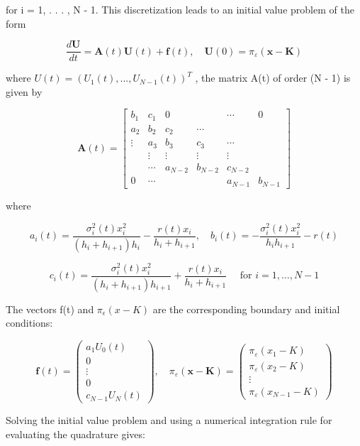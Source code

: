 for i = 1, . . . , N - 1. This discretization leads to an initial value problem of the form

$$
\frac{d \mathbf{U}}{d t}=\mathbf{A}(t) \mathbf{U}(t)+\mathbf{f}(t), \quad \mathbf{U}(0)=\pi_{\varepsilon}(\mathbf{x}-\mathbf{K})
$$

where $U(t) = (U_1(t), . . . , U_{N-1}(t))^{T}$ , the matrix A(t) of order (N - 1) is given by

$$
\mathbf{A}(t)=\left[\begin{array}{cccccc}
b_{1} & c_{1} & 0 && \cdots & 0 \\
a_{2} & b_{2} & c_{2} & \cdots & & \\
\vdots & a_{3} & b_{3} & c_{3} & \cdots & \\
& \vdots & \vdots & \vdots & \vdots & \\
& \cdots & a_{N-2} & b_{N-2} & c_{N-2} \\
0 & \cdots & & & a_{N-1} & b_{N-1}
\end{array}\right]
$$

where

$$
a_{i}(t)=\frac{\sigma_{i}^{2}(t) x_{i}^{2}}{\left(h_{i}+h_{i+1}\right) h_{i}}-\frac{r(t) x_{i}}{h_{i}+h_{i+1}}, \quad b_{i}(t)=-\frac{\sigma_{i}^{2}(t) x_{i}^{2}}{h_{i} h_{i+1}}-r(t)
$$

$$
c_{i}(t)=\frac{\sigma_{i}^{2}(t) x_{i}^{2}}{\left(h_{i}+h_{i+1}\right) h_{i+1}}+\frac{r(t) x_{i}}{h_{i}+h_{i+1}} \quad \text { for } i=1, \ldots, N-1
$$

The vectors f(t) and $\pi_{\epsilon}(x-K)$ are the corresponding boundary and initial conditions:

$$
\mathbf{f}(t)=\left(\begin{array}{c}
a_{1} U_{0}(t) \\
0 \\
\vdots \\
0 \\
c_{N-1} U_{N}(t)
\end{array}\right), \quad \pi_{\varepsilon}(\mathbf{x}-\mathbf{K})=\left(\begin{array}{c}
\pi_{\varepsilon}\left(x_{1}-K\right) \\
\pi_{\varepsilon}\left(x_{2}-K\right) \\
\vdots \\
\pi_{\varepsilon}\left(x_{N-1}-K\right)
\end{array}\right)
$$

Solving the initial value problem and using a numerical integration rule for evaluating the quadrature gives:

